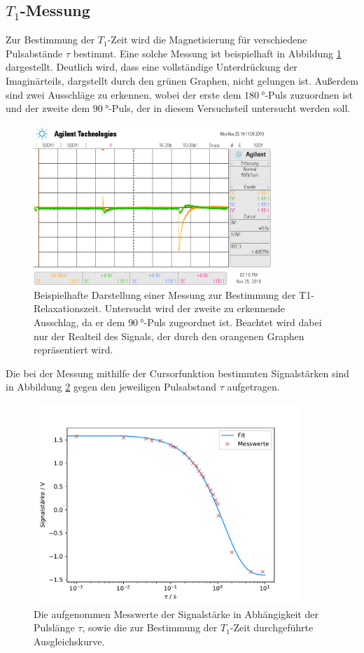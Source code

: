 \subsection{$T_1$-Messung}
Zur Bestimmung der $T_1$-Zeit wird die Magnetisierung für verschiedene Pulsabstände $\tau$ bestimmt. 
Eine solche Messung ist beispielhaft in Abbildung \ref{fig:t1} dargestellt. Deutlich wird, dass eine vollständige Unterdrückung
der Imaginärteils, dargstellt durch den grünen Graphen, nicht gelungen ist. Außerdem sind zwei Ausschläge zu erkennen, wobei der 
erste dem $\SI{180}{\degree}$-Puls zuzuordnen ist und der zweite dem $\SI{90}{\degree}$-Puls, der in diesem 
Versuchsteil untersucht werden soll.
\begin{figure}[H]
  \centering
  \includegraphics[width=0.8\textwidth]{../data/T1.png}
  \caption{Beispielhafte Darstellung einer Messung zur Bestimmung der T1-Relaxationszeit. Untersucht wird der zweite zu 
  erkennende Ausschlag, da er dem $\SI{90}{\degree}$-Puls zugeordnet ist. Beachtet wird dabei nur der Realteil des Signals, 
  der durch den orangenen Graphen repräsentiert wird.}
  \label{fig:t1}
\end{figure} \noindent
Die bei der Messung mithilfe der Cursorfunktion bestimmten Signalstärken sind in Abbildung \ref{fig:t1_fit} gegen den
jeweiligen Pulsabstand $\tau$ aufgetragen. 
\begin{figure}[H]
  \centering
  \includegraphics[width=0.9\textwidth]{../Auswertung/t1_fit.pdf}
  \caption{Die aufgenommen Messwerte der Signalstärke in Abhängigkeit der Pulslänge $\tau$, sowie die 
  zur Bestimmung der $T_1$-Zeit durchgeführte Ausgleichskurve.}
  \label{fig:t1_fit}
\end{figure}
